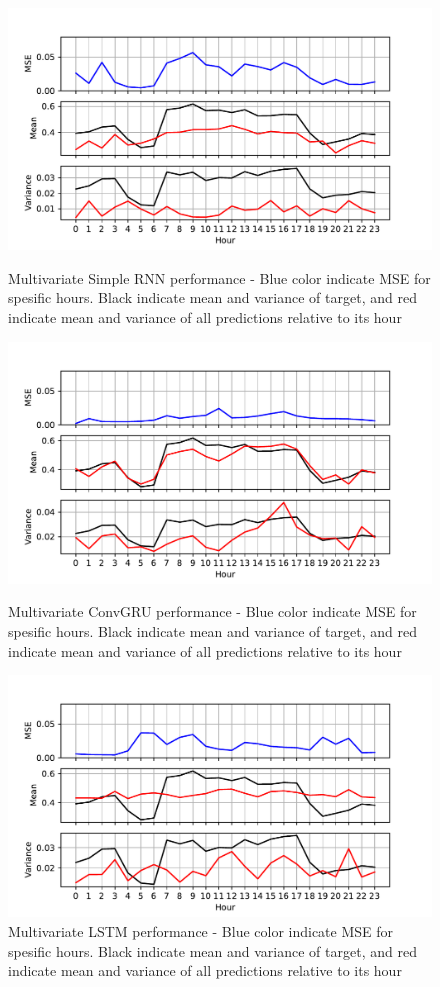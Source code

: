 \documentclass
[twocolumn,
secnumarabic,
nobibnotes,
aps,
prl,
reprint,
groupedaddress,
amsmath,
amssymb,
]{revtex4-2}
\begin{document}
\begin{figure}
  \includegraphics[width=\columnwidth]{figures/multivariate_hourly_stats_RNN.pdf}
  \caption{\label{fig:multivariate_hourly_stats_RNN} Multivariate Simple RNN performance - Blue color indicate MSE for spesific hours. Black indicate mean and variance of target, and red indicate mean and variance of all predictions relative to its hour}
  \includegraphics[width=\columnwidth]{figures/multivariate_hourly_stats_convGRU.pdf}
  \caption{\label{fig:multivariate_hourly_stats_convGRU} Multivariate ConvGRU performance - Blue color indicate MSE for spesific hours. Black indicate mean and variance of target, and red indicate mean and variance of all predictions relative to its hour}
  \includegraphics[width=\columnwidth]{figures/multivariate_hourly_stats_LSTM.pdf}
  \caption{\label{fig:multivariate_hourly_stats_LSTM} Multivariate LSTM performance - Blue color indicate MSE for spesific hours. Black indicate mean and variance of target, and red indicate mean and variance of all predictions relative to its hour}
\end{figure}
\end{document}
